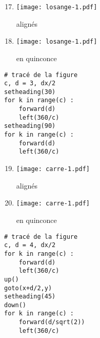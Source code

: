 \documentclass[11pt,a4paper]{article}
\begin{document}
\noindent\begin{minipage}[t]{5cm}
\begin{enumerate}\setcounter{enumi}{16}
\item \begin{minipage}{1.75cm}\texttt{[image: losange-1.pdf]}\end{minipage} alignés
\item \begin{minipage}{1.75cm}\texttt{[image: losange-1.pdf]}\end{minipage} en quinconce
\end{enumerate}
\end{minipage}
\hfill
\begin{minipage}[t]{7cm}\footnotesize
\begin{Verbatim}
# tracé de la figure
c, d = 3, dx/2
setheading(30)
for k in range(c) :
    forward(d)
    left(360/c)
setheading(90)
for k in range(c) :
    forward(d)
    left(360/c)
\end{Verbatim}
\end{minipage}
\vspace*{5mm}

\noindent\begin{minipage}[t]{5cm}
\begin{enumerate}\setcounter{enumi}{18}
\item \begin{minipage}{1.75cm}\texttt{[image: carre-1.pdf]}\end{minipage} alignés
\item \begin{minipage}{1.75cm}\texttt{[image: carre-1.pdf]}\end{minipage} en quinconce
\end{enumerate}
\end{minipage}
\hfill
\begin{minipage}[t]{7cm}\footnotesize
\begin{Verbatim}
# tracé de la figure
c, d = 4, dx/2
for k in range(c) :
    forward(d)
    left(360/c)
up()
goto(x+d/2,y)
setheading(45)
down()
for k in range(c) :
    forward(d/sqrt(2))
    left(360/c)
\end{Verbatim}
\end{minipage}
\vspace*{5mm}
\end{document}
